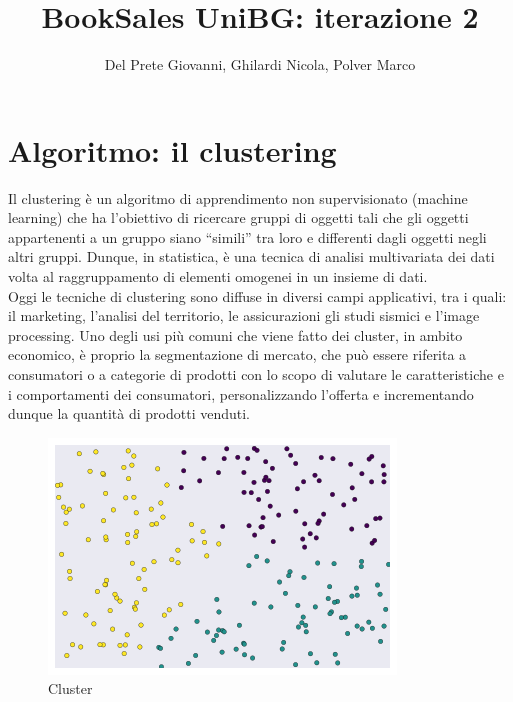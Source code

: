 \documentclass[10pt,a4paper]{report}
\author{Del Prete Giovanni, Ghilardi Nicola, Polver Marco}
\title{BookSales UniBG: iterazione 2}
\begin{document}
	
	\maketitle
	\tableofcontents
	
	\section{Algoritmo: il clustering}
	Il clustering è un algoritmo di apprendimento non supervisionato (machine learning) che ha l'obiettivo di ricercare gruppi di oggetti tali che  
	gli oggetti appartenenti a un gruppo siano “simili” tra loro e differenti dagli oggetti negli altri gruppi. Dunque, in statistica, è una tecnica di 
        analisi multivariata dei dati volta al raggruppamento di elementi omogenei in un insieme di dati.\\
        Oggi le tecniche di clustering sono diffuse in diversi campi applicativi, tra i quali: il marketing, l'analisi del territorio, le assicurazioni  gli studi sismici e l'image processing.  Uno degli usi più comuni che viene fatto dei cluster, in ambito economico, 
        è proprio la segmentazione di mercato, che può essere riferita a consumatori o a categorie di prodotti con lo scopo di valutare le caratteristiche e i comportamenti dei consumatori, personalizzando l’offerta
        e incrementando dunque la quantità di prodotti venduti.
              \begin{figure}[H]
		\centering
		\includegraphics[scale=0.9]{Cluster.png}
		\caption{Cluster}
		\end{figure}
		\newpage        
\end{document}
